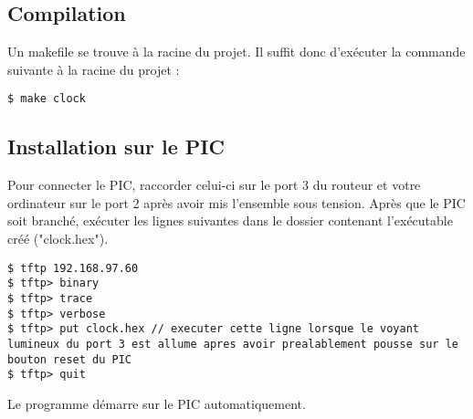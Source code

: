 
\subsection*{Compilation}

Un makefile se trouve à la racine du projet. Il suffit donc d'exécuter la commande suivante à la racine du projet :

\begin{lstlisting}
$ make clock
\end{lstlisting}

\subsection*{Installation sur le PIC}

Pour connecter le PIC, raccorder celui-ci sur le port 3 du routeur et votre ordinateur sur le port 2 après avoir mis l'ensemble sous tension.
Après que le PIC soit branché, exécuter les lignes suivantes dans le dossier contenant l'exécutable créé ("clock.hex").
\begin{lstlisting}
$ tftp 192.168.97.60
$ tftp> binary
$ tftp> trace
$ tftp> verbose
$ tftp> put clock.hex // executer cette ligne lorsque le voyant lumineux du port 3 est allume apres avoir prealablement pousse sur le bouton reset du PIC
$ tftp> quit
\end{lstlisting}

Le programme démarre sur le PIC automatiquement.


